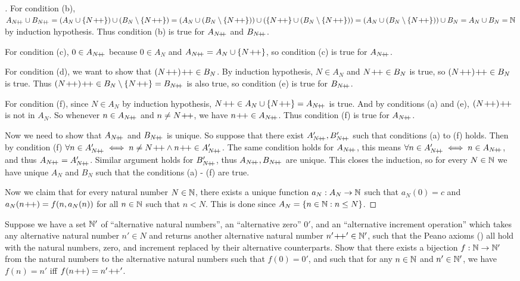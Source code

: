 \begin{proof}[]
	For condition (b), \(A_{N\pp} \cup B_{N\pp} = (A_N \cup \set{N\pp}) \cup (B_N \setminus \set{N\pp}) = (A_N \cup (B_N \setminus \set{N\pp})) \cup (\set{N\pp} \cup (B_N \setminus \set{N\pp})) = (A_N \cup (B_N \setminus \set{N\pp})) \cup B_N = A_N \cup B_N = \N\) by induction hypothesis.
	Thus condition (b) is true for \(A_{N\!+\!\!+}\) and \(B_{N\!+\!\!+}\).

	For condition (c), \(0 \in A_{N\!+\!\!+}\) because \(0 \in A_N\) and \(A_{N\!+\!\!+} = A_N \cup \left\lbrace N\!+\!\!+\right\rbrace\), so condition (c) is true for \(A_{N\!+\!\!+}\).

	For condition (d), we want to show that \((N\!+\!\!+)\!+\!\!+ \in B_N\).
	By induction hypothesis, \(N \in A_N\) and \(N\!+\!\!+ \in B_N\) is true, so \((N\!+\!\!+)\!+\!\!+ \in B_N\) is true.
	Thus \((N\pp)\pp \in B_N \setminus \set{N\pp} = B_{N\pp}\) is also true, so condition (e) is true for \(B_{N\!+\!\!+}\).

	For condition (f), since \(N \in A_N\) by induction hypothesis, \(N\pp \in A_N \cup \set{N\pp} = A_{N\pp}\) is true.
	And by conditions (a) and (e), \((N\!+\!\!+)\!+\!\!+\) is not in \(A_N\).
	So whenever \(n \in A_{N\!+\!\!+}\) and \(n \neq N\!+\!\!+\), we have \(n\!+\!\!+ \in A_{N\!+\!\!+}\).
	Thus condition (f) is true for \(A_{N\!+\!\!+}\).

	Now we need to show that \(A_{N\!+\!\!+}\) and \(B_{N\!+\!\!+}\) is unique.
	So suppose that there exist \(A_{N\!+\!\!+}', B_{N\!+\!\!+}'\) such that conditions (a) to (f) holds.
	Then by condition (f) \(\forall n \in A_{N\pp}' \iff n \neq N\pp \land n\pp \in A_{N\pp}'\).
	The same condition holds for \(A_{N\!+\!\!+}\), this means \(\forall n \in A_{N\!+\!\!+}' \iff n \in A_{N\!+\!\!+}\), and thus \(A_{N\!+\!\!+} = A_{N\!+\!\!+}'\).
	Similar argument holds for \(B_{N\!+\!\!+}'\), thus \(A_{N\!+\!\!+}, B_{N\!+\!\!+}\) are unique.
	This closes the induction, so for every \(N \in \mathbb{N}\) we have unique \(A_N\) and \(B_N\) such that the conditions (a) - (f) are true.

	Now we claim that for every natural number \(N \in \mathbb{N}\), there exists a unique function \(a_N : A_N \to \mathbb{N}\) such that \(a_N(0) = c\) and \(a_N(n\!+\!\!+) = f(n, a_{N}(n))\) for all \(n \in \mathbb{N}\) such that \(n < N\).
	This is done since \(A_N = \left\lbrace n \in \mathbb{N} : n \leq N\right\rbrace\).
\end{proof}

\begin{ex}\label{ex:3.5.13}
	Suppose we have a set \(\mathbb{N}'\) of ``alternative natural numbers'', an ``alternative zero'' \(0'\), and an ``alternative increment operation'' which takes any alternative natural number \(n' \in N\) and returns another alternative natural number \(n'\!+\!\!+' \in \mathbb{N}'\), such that the Peano axioms () all hold with the natural numbers, zero, and increment replaced by their alternative counterparts.
	Show that there exists a bijection \(f : \mathbb{N} \to \mathbb{N}'\) from the natural numbers to the alternative natural numbers such that \(f(0) = 0'\), and such that for any \(n \in \mathbb{N}\) and \(n' \in \mathbb{N}'\), we have \(f(n) = n'\) iff \(f(n\!+\!\!+) = n'\!+\!\!+'\).
\end{ex}

